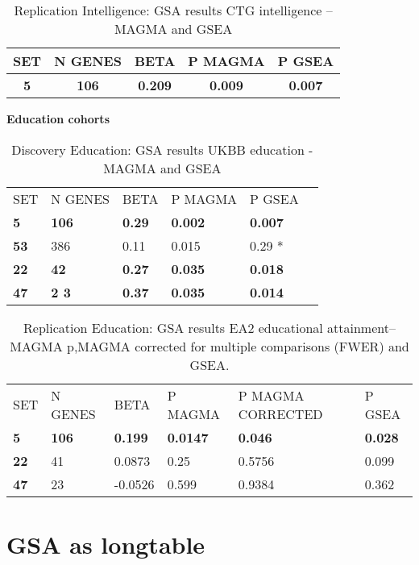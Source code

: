 \begin{table}[]
    \centering
    \begin{tabular}{c|c|c|c|c}
        SET & N GENES & BETA & P MAGMA & P GSEA\tabularnewline
        \hline
\textbf{5} & \textbf{106} & \textbf{0.209} & \textbf{0.009} & \textbf{0.007}\tabularnewline
    \end{tabular}
    \caption{Replication Intelligence: GSA results CTG intelligence -- MAGMA and GSEA}
    \label{Table:Replication Intelligence: GSA results CTG intelligence -- MAGMA and GSEA}
\end{table}




\textbf{Education cohorts}
\begin{table}
    \centering
\begin{tabular}[]{llllll}
\toprule
SET & N GENES & BETA & P MAGMA & P GSEA\tabularnewline
\textbf{5} & \textbf{106} & \textbf{0.29} & \textbf{0.002} & \textbf{0.007}\tabularnewline
\textbf{53} & 386 & 0.11 & 0.015 & 0.29 *\tabularnewline
\textbf{22} & \textbf{42} & \textbf{0.27} & \textbf{0.035} & \textbf{0.018}\tabularnewline
\textbf{47} & \textbf{2
3} & \textbf{0.37} & \textbf{0.035} & \textbf{0.014}\tabularnewline
\bottomrule
\end{tabular}
\caption{Discovery Education: GSA results UKBB education - MAGMA and GSEA}
\label{Discovery Education: GSA results UKBB education - MAGMA and GSEA}
\end{table}

\begin{table}[]
    \centering
    \begin{tabular}[]{llllll}
\toprule
SET & N GENES & BETA & P MAGMA & P MAGMA CORRECTED & P GSEA\tabularnewline
\textbf{5} & \textbf{106} & \textbf{0.199} & \textbf{0.0147} & \textbf{0.046} & \textbf{0.028}\tabularnewline
\textbf{22} & 41 & 0.0873 & 0.25 & 0.5756 & 0.099\tabularnewline
\textbf{47} & 23 & -0.0526 & 0.599 & 0.9384 & 0.362\tabularnewline
\bottomrule


\end{tabular}
\caption{Replication Education: GSA results EA2 educational attainment-- MAGMA p,MAGMA corrected for multiple comparisons (FWER) and GSEA.}
\end{table}




\pagebreak
\section{GSA as longtable}

